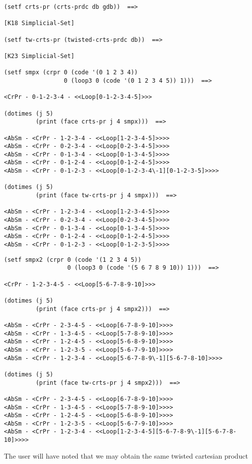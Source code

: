 {\footnotesize\begin{verbatim}
(setf crts-pr (crts-prdc db gdb))  ==>

[K18 Simplicial-Set]

(setf tw-crts-pr (twisted-crts-prdc db))  ==>

[K23 Simplicial-Set]

(setf smpx (crpr 0 (code '(0 1 2 3 4)) 
                 0 (loop3 0 (code '(0 1 2 3 4 5)) 1)))  ==>

<CrPr - 0-1-2-3-4 - <<Loop[0-1-2-3-4-5]>>>

(dotimes (j 5)
         (print (face crts-pr j 4 smpx)))  ==>

<AbSm - <CrPr - 1-2-3-4 - <<Loop[1-2-3-4-5]>>>> 
<AbSm - <CrPr - 0-2-3-4 - <<Loop[0-2-3-4-5]>>>> 
<AbSm - <CrPr - 0-1-3-4 - <<Loop[0-1-3-4-5]>>>> 
<AbSm - <CrPr - 0-1-2-4 - <<Loop[0-1-2-4-5]>>>> 
<AbSm - <CrPr - 0-1-2-3 - <<Loop[0-1-2-3-4\-1][0-1-2-3-5]>>>> 

(dotimes (j 5)
         (print (face tw-crts-pr j 4 smpx)))  ==>

<AbSm - <CrPr - 1-2-3-4 - <<Loop[1-2-3-4-5]>>>> 
<AbSm - <CrPr - 0-2-3-4 - <<Loop[0-2-3-4-5]>>>> 
<AbSm - <CrPr - 0-1-3-4 - <<Loop[0-1-3-4-5]>>>> 
<AbSm - <CrPr - 0-1-2-4 - <<Loop[0-1-2-4-5]>>>> 
<AbSm - <CrPr - 0-1-2-3 - <<Loop[0-1-2-3-5]>>>> 
\end{verbatim}}
\newpage
{\footnotesize\begin{verbatim}
(setf smpx2 (crpr 0 (code '(1 2 3 4 5)) 
                  0 (loop3 0 (code '(5 6 7 8 9 10)) 1)))  ==>

<CrPr - 1-2-3-4-5 - <<Loop[5-6-7-8-9-10]>>>

(dotimes (j 5)
         (print (face crts-pr j 4 smpx2)))  ==>

<AbSm - <CrPr - 2-3-4-5 - <<Loop[6-7-8-9-10]>>>> 
<AbSm - <CrPr - 1-3-4-5 - <<Loop[5-7-8-9-10]>>>> 
<AbSm - <CrPr - 1-2-4-5 - <<Loop[5-6-8-9-10]>>>> 
<AbSm - <CrPr - 1-2-3-5 - <<Loop[5-6-7-9-10]>>>> 
<AbSm - <CrPr - 1-2-3-4 - <<Loop[5-6-7-8-9\-1][5-6-7-8-10]>>>> 

(dotimes (j 5)
         (print (face tw-crts-pr j 4 smpx2)))  ==>

<AbSm - <CrPr - 2-3-4-5 - <<Loop[6-7-8-9-10]>>>> 
<AbSm - <CrPr - 1-3-4-5 - <<Loop[5-7-8-9-10]>>>> 
<AbSm - <CrPr - 1-2-4-5 - <<Loop[5-6-8-9-10]>>>> 
<AbSm - <CrPr - 1-2-3-5 - <<Loop[5-6-7-9-10]>>>> 
<AbSm - <CrPr - 1-2-3-4 - <<Loop[1-2-3-4-5][5-6-7-8-9\-1][5-6-7-8-10]>>>> 
\end{verbatim}}
The user will have noted that we may obtain the same twisted cartesian product
